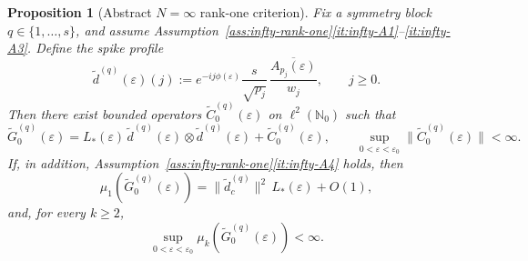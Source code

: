 \documentclass[11pt]{amsart}
\numberwithin{equation}{section}
\theoremstyle{plain}
\newtheorem{proposition}[theorem]{Proposition}
\theoremstyle{definition}
\theoremstyle{remark}
\begin{document}
\begin{proposition}[Abstract \(N=\infty\) rank-one criterion]
\label{prop:universality-infty}
Fix a symmetry block \(q\in\{1,\dots,s\}\), and assume
Assumption~\ref{ass:infty-rank-one}\textup{\ref{it:infty-A1}--\ref{it:infty-A3}}.
Define the spike profile
\[
\widetilde d^{(q)}(\varepsilon)(j)
:=
 e^{-ij\phi(\varepsilon)}
 \frac{s}{\sqrt{p_j}}\,
 \frac{\overline{A_{p_j}(\varepsilon)}}{w_j},
 \qquad j\ge0.
\]
Then there exist bounded operators
\(\widetilde C^{(q)}_0(\varepsilon)\) on \(\ell^2(\mathbb N_0)\) such that
\[
\widetilde G^{(q)}_0(\varepsilon)
=
L_*(\varepsilon)\,
\widetilde d^{(q)}(\varepsilon)\otimes
\widetilde d^{(q)}(\varepsilon)
+
\widetilde C^{(q)}_0(\varepsilon),
\qquad
\sup_{0<\varepsilon<\varepsilon_0}
\|\widetilde C^{(q)}_0(\varepsilon)\|
<\infty .
\]
If, in addition,
Assumption~\ref{ass:infty-rank-one}\textup{\ref{it:infty-A4}} holds, then
\[
\mu_1\!\left(\widetilde G^{(q)}_0(\varepsilon)\right)
=
\|\widetilde d^{(q)}_c\|^2\,L_*(\varepsilon)+O(1),
\]
and, for every \(k\ge2\),
\[
\sup_{0<\varepsilon<\varepsilon_0}
\mu_k\!\left(\widetilde G^{(q)}_0(\varepsilon)\right)
<\infty .
\]
\end{proposition}
\end{document}
